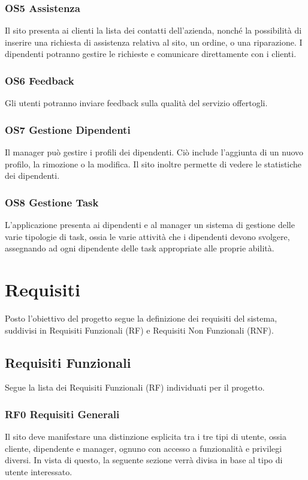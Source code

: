 \documentclass{report}
\begin{document}
\subsection*{OS5 Assistenza}
Il sito presenta ai clienti la lista dei contatti dell’azienda, nonché la possibilità di inserire una richiesta di assistenza relativa al sito, un ordine, o una riparazione. I dipendenti potranno gestire le richieste e comunicare direttamente con i clienti.


\subsection*{OS6 Feedback}
Gli utenti potranno inviare feedback sulla qualità del servizio offertogli.

\subsection*{OS7 Gestione Dipendenti}

Il manager può gestire i profili dei dipendenti. Ciò include l’aggiunta di un nuovo profilo, la rimozione o la modifica. Il sito inoltre permette di vedere le statistiche dei dipendenti.


\subsection*{OS8 Gestione Task}
L’applicazione presenta ai dipendenti e al manager un sistema di gestione delle varie tipologie di task, ossia le varie attività che i dipendenti devono svolgere, assegnando ad ogni dipendente delle task appropriate alle proprie abilità.


\chapter{Requisiti}
Posto l’obiettivo del progetto segue la definizione dei requisiti del sistema, suddivisi in Requisiti Funzionali (RF) e Requisiti Non Funzionali (RNF).



\section{Requisiti Funzionali}
Segue la lista dei Requisiti Funzionali (RF) individuati per il progetto.


\subsection*{RF0 Requisiti Generali}
Il sito deve manifestare una distinzione esplicita tra i tre tipi di utente, ossia cliente, dipendente e manager, ognuno con accesso a funzionalità e privilegi diversi.
In vista di questo, la seguente sezione verrà divisa in base al tipo di utente interessato.
\end{document}

